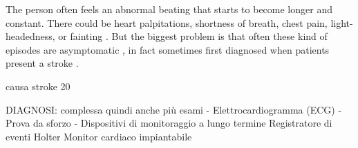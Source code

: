 The person often feels an abnormal beating that starts to become longer and constant. There could be heart palpitations, shortness of breath, chest pain,  light-headedness, or fainting \cite{chamberlain_gray_houghton_2010}. But the biggest problem is that often these kind of episodes are asymptomatic \cite{Munger2014}, in fact sometimes first diagnosed when patients present a stroke \cite{page2003asymptomatic}.



causa stroke 20%

DIAGNOSI: complessa quindi anche più esami
- Elettrocardiogramma (ECG)
- Prova da sforzo
- Dispositivi di monitoraggio a lungo termine
        Registratore di eventi
        Holter
        Monitor cardiaco impiantabile